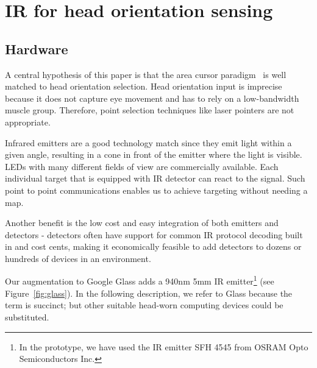 \section{IR for head orientation sensing}
\subsection{Hardware}
A central hypothesis of this paper is that the area cursor paradigm~\cite{kabbash1995prince} is well matched to head orientation selection. Head orientation input is imprecise because it does not capture eye movement and has to rely on a low-bandwidth muscle group. Therefore, point selection techniques like laser pointers are not appropriate. 

Infrared emitters are a good technology match since they emit light within a given angle, resulting in a cone in front of the emitter where the light is visible. LEDs with many different fields of view are commercially available. Each individual target that is equipped with IR detector can react to the signal. Such point to point communications enables us to achieve targeting without needing a map.

Another benefit is the low cost and easy integration of both emitters and detectors - detectors often have support for common IR protocol decoding built in and cost cents, making it economically feasible to add detectors to dozens or hundreds of devices in an environment.

Our augmentation to Google Glass adds a 940nm 5mm IR emitter\footnote{In the prototype, we have used the IR emitter SFH 4545 from OSRAM Opto Semiconductors Inc.} (see Figure~\ref{fig:glass}).  In the following description, we refer to Glass because the term is succinct; but other suitable head-worn computing devices could be substituted.


